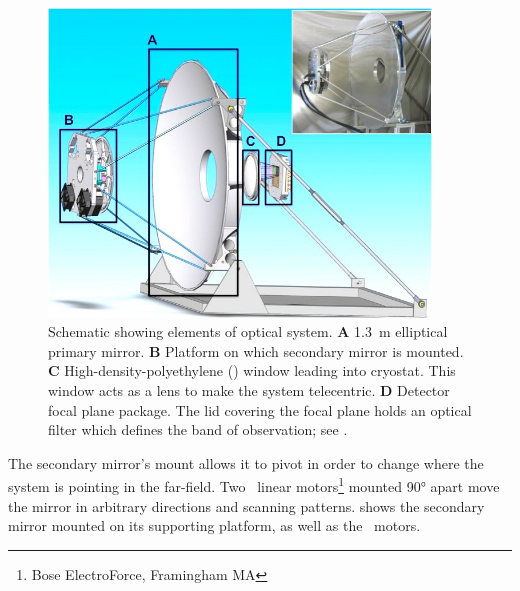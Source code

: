 \begin{figure}
\centering
\includegraphics[width=4in]{images/optics-labeled-fixed.jpg}
\caption[Schematic showing elements of optical system]{
Schematic showing elements of optical system.
\textbf{A} \SI{1.3}{\m} elliptical primary mirror.
\textbf{B} Platform on which secondary mirror is mounted.
\textbf{C} High-density-polyethylene (\HDPE) window leading into cryostat.
           This window acts as a lens to make the system telecentric.
\textbf{D} Detector focal plane package.
           The lid covering the focal plane holds an optical filter which defines the band of observation; see .
}
\label{fig:ch4-optical-schematic}
\end{figure}

The secondary mirror's mount allows it to pivot in order to change where the system is pointing in the far-field.
Two \BOSE\ linear motors\footnote{Bose ElectroForce, Framingham MA} mounted \ang{90} apart move the mirror in arbitrary directions and scanning patterns.
 shows the secondary mirror mounted on its supporting platform, as well as the \BOSE\ motors.


